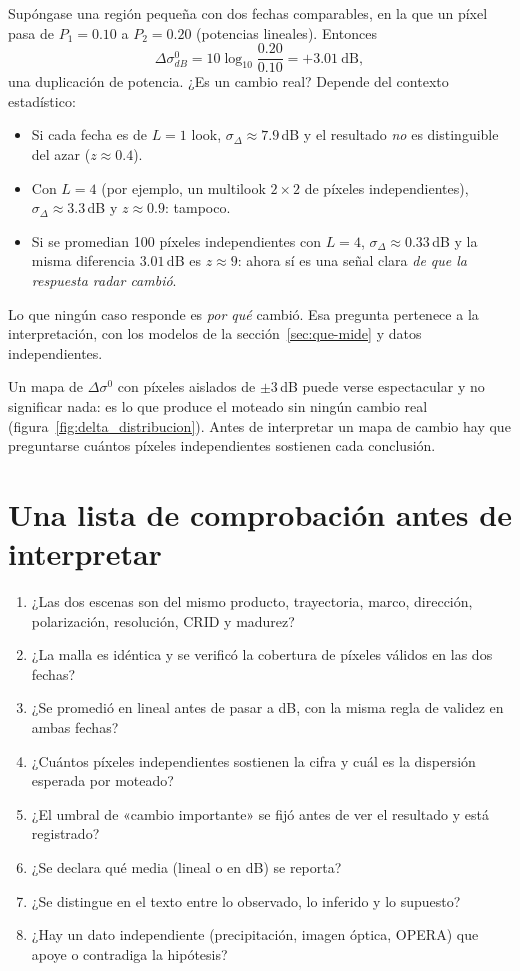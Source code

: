 \documentclass[11pt,a4paper]{article}
\begin{document}
Supóngase una región pequeña con dos fechas comparables, en la que un píxel pasa de $P_1=0.10$ a $P_2=0.20$
(potencias lineales). Entonces
\begin{equation}
  \Delta\sigma^0_{dB}=10\log_{10}\frac{0.20}{0.10}=+3.01\ \text{dB},
\end{equation}
una duplicación de potencia. ¿Es un cambio real? Depende del contexto estadístico:
\begin{itemize}
  \item Si cada fecha es de $L=1$ look, $\sigma_\Delta\approx7.9$\,dB y el resultado \emph{no} es distinguible
        del azar ($z\approx0.4$).
  \item Con $L=4$ (por ejemplo, un multilook $2\times2$ de píxeles independientes), $\sigma_\Delta\approx3.3$\,dB
        y $z\approx0.9$: tampoco.
  \item Si se promedian 100 píxeles independientes con $L=4$, $\sigma_\Delta\approx0.33$\,dB y la misma
        diferencia $3.01$\,dB es $z\approx9$: ahora sí es una señal clara \emph{de que la respuesta radar
        cambió}.
\end{itemize}
Lo que ningún caso responde es \emph{por qué} cambió. Esa pregunta pertenece a la interpretación, con los modelos
de la sección~\ref{sec:que-mide} y datos independientes.

\begin{atencion}
Un mapa de $\Delta\sigma^0$ con píxeles aislados de $\pm3$\,dB puede verse espectacular y no significar nada: es
lo que produce el moteado sin ningún cambio real (figura~\ref{fig:delta_distribucion}). Antes de interpretar
un mapa de cambio hay que preguntarse cuántos píxeles independientes sostienen cada conclusión.
\end{atencion}

\section{Una lista de comprobación antes de interpretar}
\label{sec:checklist-radar}

\begin{enumerate}
  \item ¿Las dos escenas son del mismo producto, trayectoria, marco, dirección, polarización, resolución,
        CRID y madurez?
  \item ¿La malla es idéntica y se verificó la cobertura de píxeles válidos en las dos fechas?
  \item ¿Se promedió en lineal antes de pasar a dB, con la misma regla de validez en ambas fechas?
  \item ¿Cuántos píxeles independientes sostienen la cifra y cuál es la dispersión esperada por moteado?
  \item ¿El umbral de «cambio importante» se fijó antes de ver el resultado y está registrado?
  \item ¿Se declara qué media (lineal o en dB) se reporta?
  \item ¿Se distingue en el texto entre lo observado, lo inferido y lo supuesto?
  \item ¿Hay un dato independiente (precipitación, imagen óptica, OPERA) que apoye o contradiga la hipótesis?
\end{enumerate}
\end{document}
